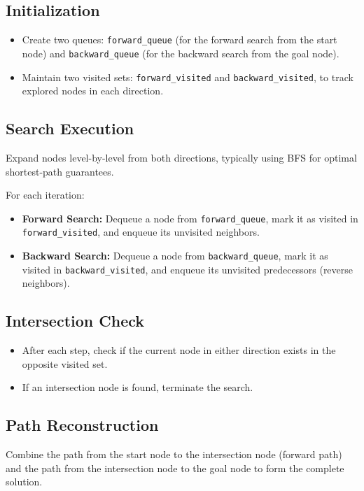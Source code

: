 		\subsection*{Initialization}
		\begin{itemize}
			\item Create two queues: \texttt{forward\_queue} (for the forward search from the start node) and \texttt{backward\_queue} (for the backward search from the goal node).
			\item Maintain two visited sets: \texttt{forward\_visited} and \texttt{backward\_visited}, to track explored nodes in each direction.
		\end{itemize}
		
		\subsection*{Search Execution}
		Expand nodes level-by-level from both directions, typically using BFS for optimal shortest-path guarantees.
		
		For each iteration:
		\begin{itemize}
			\item \textbf{Forward Search:} Dequeue a node from \texttt{forward\_queue}, mark it as visited in \texttt{forward\_visited}, and enqueue its unvisited neighbors.
			\item \textbf{Backward Search:} Dequeue a node from \texttt{backward\_queue}, mark it as visited in \texttt{backward\_visited}, and enqueue its unvisited predecessors (reverse neighbors).
		\end{itemize}
		
		\subsection*{Intersection Check}
		\begin{itemize}
			\item After each step, check if the current node in either direction exists in the opposite visited set.
			\item If an intersection node is found, terminate the search.
		\end{itemize}
		
		\subsection*{Path Reconstruction}
		Combine the path from the start node to the intersection node (forward path) and the path from the intersection node to the goal node to form the complete solution.
		

